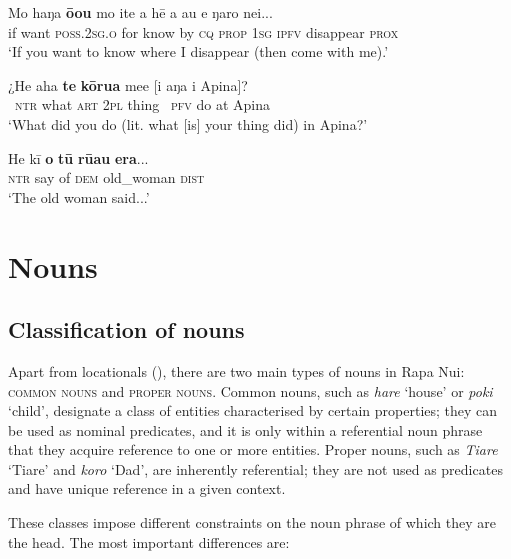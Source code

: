 \ea\label{ex:3.62}
\gll Mo haŋa \textbf{ō{\ꞌ}ou} mo {\ꞌ}ite a hē a au e ŋaro nei...\\
if want \textsc{poss.2sg.o} for know by \textsc{cq} \textsc{prop} \textsc{1sg} \textsc{ipfv} disappear \textsc{prox}\\

\glt 
‘If you want to know where I disappear (then come with me).’ \textstyleExampleref{[R212.010]} 
\z

\ea\label{ex:3.63}
\gll ¿He aha \textbf{te} \textbf{kōrua} me{\ꞌ}e [i aŋa {\ꞌ}i {\ꞌ}Apina]? \\
~\textsc{ntr} what \textsc{art} \textsc{2pl} thing \textsc{~pfv} do at Apina \\

\glt 
‘What did you do (lit. what [is] your thing did) in Apina?’ \textstyleExampleref{[R301.197]} 
\z

\ea\label{ex:3.64}
\gll He kī \textbf{o} \textbf{tū} \textbf{rū{\ꞌ}au} \textbf{era}...\\
\textsc{ntr} say of \textsc{dem} old\_woman \textsc{dist}\\

\glt 
‘The old woman said...’ \textstyleExampleref{[R313.171]} 
\z

\section{Nouns}\label{sec:3.3}
\subsection{Classification of nouns}\label{sec:3.3.1}
Apart from locationals (), there are two main types of nouns in Rapa Nui: \textsc{common nouns} and \textsc{proper nouns}. Common nouns, such as \textit{hare} ‘house’ or \textit{poki} ‘child’, designate a class of entities characterised by certain properties; they can be used as nominal predicates, and it is only within a referential noun phrase that they acquire reference to one or more entities. Proper nouns, such as \textit{Tiare} ‘Tiare’ and \textit{koro} ‘Dad’, are inherently referential; they are not used as predicates and have unique reference in a given context.

These classes impose different constraints on the noun phrase of which they are the head. The most important differences are:


